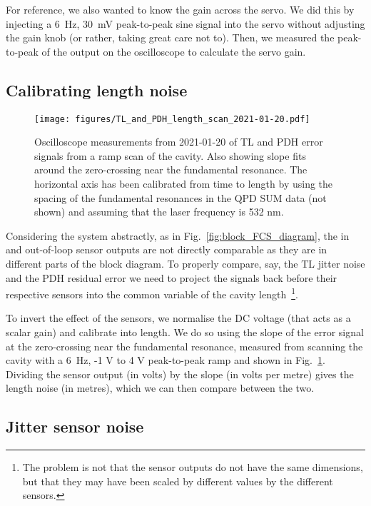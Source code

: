 \documentclass[aps,pra,superscriptaddress,reprint,nofootinbib]{revtex4-1}
\begin{document}
For reference, we also wanted to know the gain across the servo. We did this by injecting a 6~Hz, 30~mV peak-to-peak sine signal into the servo without adjusting the gain knob (or rather, taking great care not to). Then, we measured the peak-to-peak of the output on the oscilloscope to calculate the servo gain.

\subsection{Calibrating length noise}
\label{sec:length_noise}

\begin{figure}
	\texttt{[image: figures/TL\_and\_PDH\_length\_scan\_2021-01-20.pdf]}
	\caption{Oscilloscope measurements from 2021-01-20 of TL and PDH error signals from a ramp scan of the cavity. Also showing slope fits around the zero-crossing near the fundamental resonance. The horizontal axis has been calibrated from time to length by using the spacing of the fundamental resonances in the QPD SUM data (not shown) and assuming that the laser frequency is 532 nm.}
	\label{fig:TL_and_PDH_length_scan_2021-01-20}
\end{figure}

Considering the system abstractly, as in Fig.~\ref{fig:block_FCS_diagram}, the in and out-of-loop sensor outputs are not directly comparable as they are in different parts of the block diagram. To properly compare, say, the TL jitter noise and the PDH residual error we need to project the signals back before their respective sensors into the common variable of the cavity length~\footnote{The problem is not that the sensor outputs do not have the same dimensions, but that they may have been scaled by different values by the different sensors.}.

To invert the effect of the sensors, we normalise the DC voltage (that acts as a scalar gain) and calibrate into length. We do so using the slope of the error signal at the zero-crossing near the fundamental resonance, measured from scanning the cavity with a 6~Hz, -1 V to 4 V peak-to-peak ramp and shown in Fig.~\ref{fig:TL_and_PDH_length_scan_2021-01-20}. Dividing the sensor output (in volts) by the slope (in volts per metre) gives the length noise (in metres), which we can then compare between the two.


\subsection{Jitter sensor noise}
\label{sec:jitter_sensor_noise}
\end{document}
